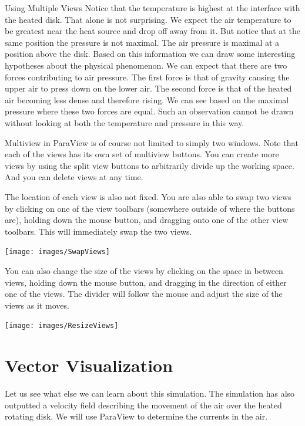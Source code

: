 \begin{exercise}{Using Multiple Views}
  Notice that the temperature is highest at the interface with the heated
  disk.  That alone is not surprising.  We expect the air temperature to be
  greatest near the heat source and drop off away from it.  But notice that
  at the same position the pressure is not maximal.  The air pressure is
  maximal at a position above the disk.  Based on this information we can
  draw some interesting hypotheses about the physical phenomenon.  We can
  expect that there are two forces contributing to air pressure.  The first
  force is that of gravity causing the upper air to press down on the lower
  air.  The second force is that of the heated air becoming less dense and
  therefore rising.  We can see based on the maximal pressure where these
  two forces are equal.  Such an observation cannot be drawn without
  looking at both the temperature and pressure in this way.
\end{exercise}

Multiview in ParaView is of course not limited to simply two windows.  Note
that each of the views has its own set of multiview buttons.  You can
create more views by using the split view buttons \splitViewH \splitViewV
to arbitrarily divide up the working space.  And you can delete views
\deleteView at any time.

The location of each view is also not fixed.  You are also able to swap two
views by clicking on one of the view toolbars (somewhere outside of where
the buttons are), holding down the mouse button, and dragging onto one of
the other view toolbars.  This will immediately swap the two views.

\begin{inlinefig}
  \texttt{[image: images/SwapViews]}
\end{inlinefig}

You can also change the size of the views by clicking on the space in
between views, holding down the mouse button, and dragging in the direction
of either one of the views.  The divider will follow the mouse and adjust
the size of the views as it moves.

\begin{inlinefig}
  \texttt{[image: images/ResizeViews]}
\end{inlinefig}


\section{Vector Visualization}

Let us see what else we can learn about this simulation.  The simulation
has also outputted a velocity field describing the movement of the air over
the heated rotating disk.  We will use ParaView to determine the currents
in the air.

